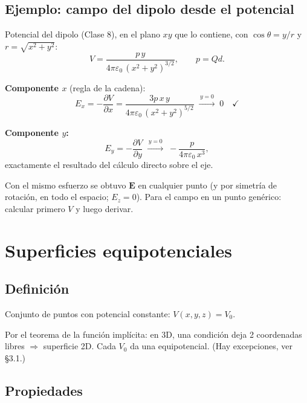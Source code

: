 \documentclass[12pt,a4paper]{article}
\begin{document}
\subsection{Ejemplo: campo del dipolo desde el potencial}

Potencial del dipolo (Clase 8), en el plano $xy$ que lo contiene, con
$\cos\theta = y/r$ y $r=\sqrt{x^2+y^2}$:
\[
V = \frac{p\,y}{4\pi\varepsilon_0\,(x^2+y^2)^{3/2}}, \qquad p = Qd.
\]

\textbf{Componente $x$} (regla de la cadena):
\[
E_x = -\frac{\partial V}{\partial x}
    = \frac{3p\,x\,y}{4\pi\varepsilon_0\,(x^2+y^2)^{5/2}}
    \;\xrightarrow{\,y=0\,}\; 0 \quad\checkmark
\]

\textbf{Componente $y$:}
\[
E_y = -\frac{\partial V}{\partial y}
    \;\xrightarrow{\,y=0\,}\; -\frac{p}{4\pi\varepsilon_0\,x^3},
\]
exactamente el resultado del cálculo directo sobre el eje.

\begin{keybox}
  Con el mismo esfuerzo se obtuvo $\mathbf{E}$ en cualquier punto (y por
  simetría de rotación, en todo el espacio; $E_z=0$). Para el campo en un
  punto genérico: calcular primero $V$ y luego derivar.
\end{keybox}

\section{Superficies equipotenciales}

\subsection{Definición}

Conjunto de puntos con potencial constante: $V(x,y,z) = V_0$.

\begin{notebox}
  Por el teorema de la función implícita: en 3D, una condición deja 2
  coordenadas libres $\Rightarrow$ superficie 2D. Cada $V_0$ da una
  equipotencial. (Hay excepciones, ver §3.1.)
\end{notebox}

\subsection{Propiedades}
\end{document}
